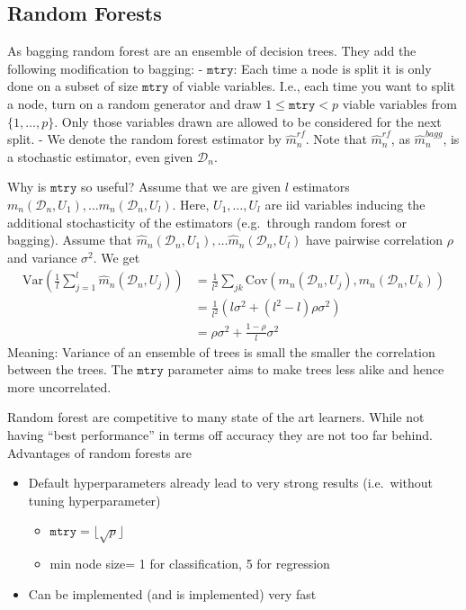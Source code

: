 \documentclass[
]{book}
\providecommand{\tightlist}{%
  \setlength{\itemsep}{0pt}\setlength{\parskip}{0pt}}
\begin{document}
\hypertarget{random-forests}{%
\subsection{Random Forests}\label{random-forests}}

 As bagging random forest are an ensemble of decision trees. They add the following modification to bagging:
- \(\texttt{mtry}\): Each time a node is split it is only done on a subset of size \(\texttt{mtry}\) of viable variables. I.e., each time you want to split a node, turn on a random generator and draw \(1\leq\texttt{mtry}<p\) viable variables from \(\{1,\dots,p\}\). Only those variables drawn are allowed to be considered for the next split.
- We denote the random forest estimator by \(\hat m^{rf}_n\). Note that \(\hat m^{rf}_n\), as \(\hat m^{bagg}_n\), is a stochastic estimator, even given \(\mathcal D_n\).

Why is \(\texttt{mtry}\) so useful? Assume that we are given \(l\) estimators \(m_n(\mathcal D_n, U_1), \dots m_n(\mathcal D_n, U_l)\). Here, \(U_1,\dots, U_l\) are iid variables inducing the additional stochasticity of the estimators (e.g.~through random forest or bagging). Assume that \(\hat m_n(\mathcal D_n, U_1), \dots \hat m_n(\mathcal D_n, U_l)\) have pairwise correlation \(\rho\) and variance \(\sigma^2\). We get
\begin{align*}
\textrm{Var}\left (\frac 1 l \sum_{j=1}^l \hat m_n(\mathcal D_n, U_j)\right)&= \frac 1 {l^2} \sum_{jk} \textrm{Cov}(m_n(\mathcal D_n, U_j),m_n(\mathcal D_n, U_k))\\&=\frac 1 {l^2} \left( l\sigma^2+ (l^2-l)\rho\sigma^2\right)\\&= \rho \sigma^2 + \frac{1-\rho}{l}\sigma^2
\end{align*}
Meaning: Variance of an ensemble of trees is small the smaller the correlation between the trees. The \(\texttt{mtry}\) parameter aims to make trees less alike and hence more uncorrelated.

Random forest are competitive to many state of the art learners. While not having ``best performance'' in terms off accuracy they are not too far behind. Advantages of random forests are

\begin{itemize}
\tightlist
\item
  Default hyperparameters already lead to very strong results (i.e.~without tuning hyperparameter)

  \begin{itemize}
  \tightlist
  \item
    \(\texttt {mtry}=\lfloor \sqrt{p}\rfloor\)
  \item
    min node size= 1 for classification, 5 for regression
  \end{itemize}
\item
  Can be implemented (and is implemented) very fast
\end{itemize}
\end{document}
